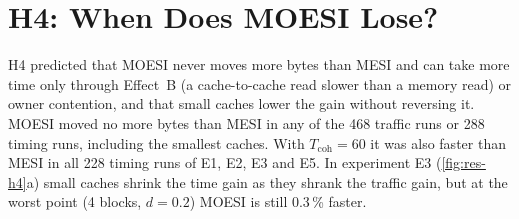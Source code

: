 \section{H4: When Does MOESI Lose?}
\label{sec:res-h4}
%

H4 predicted that MOESI never moves more bytes than MESI and can take more time only
through Effect~B (a cache-to-cache read slower than a memory read) or owner
contention, and that small caches lower the gain without reversing it. MOESI moved
no more bytes than MESI in any of the 468 traffic runs or 288 timing runs,
including the smallest caches. With $T_{\mathrm{coh}}=60$ it was also faster than
MESI in all 228 timing runs of E1, E2, E3 and E5. In experiment E3
(\cref{fig:res-h4}a) small caches shrink the time gain as they shrank the traffic
gain, but at the worst point (4 blocks, $d=0.2$) MOESI is still 0.3\,\% faster.

